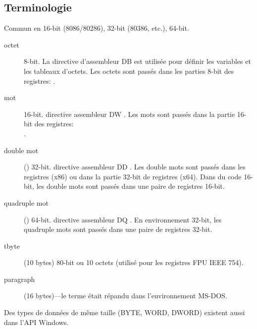 
\subsection{Terminologie}

Commun en 16-bit (8086/80286), 32-bit (80386, etc.), 64-bit.

\begin{description}
	\item[octet] 8-bit.
		La directive d'assembleur DB est utilisée pour définir les variables et les tableaux d'octets.
		Les octets sont passés dans les parties 8-bit des registres: .
	\item[mot] 16-bit. 
		directive assembleur DW \dittoclosing.
		Les mots sont passés dans la partie 16-bit des registres:\\
			.
	\item[double mot] () 32-bit.
		directive assembleur DD \dittoclosing.
		Les double mots sont passés dans les registres (x86) ou dans la partie 32-bit de registres (x64).
		Dans du code 16-bit, les double mots sont passés dans une paire de registres 16-bit.
	\item[quadruple mot] () 64-bit.
		directive assembleur DQ \dittoclosing.
		En environnement 32-bit, les quadruple mots sont passés dans une paire de registres 32-bit.
	\item[tbyte] (10 bytes) 80-bit ou 10 octets (utilisé pour les registres FPU IEEE 754).
	\item[paragraph] (16 bytes)---le terme était répandu dans l'environnement MS-DOS.
\end{description}


Des types de données de même taille (BYTE, WORD, DWORD) existent aussi dans l'\ac{API} Windows.


